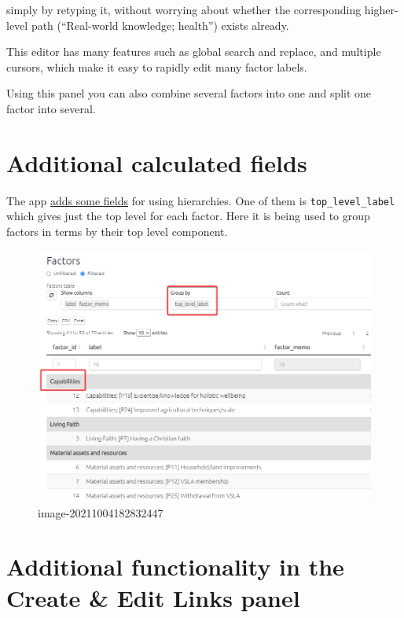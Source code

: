 \documentclass[
]{book}
\begin{document}
simply by retyping it, without worrying about whether the corresponding higher-level path (``Real-world knowledge; health'') exists already.

This editor has many features such as global search and replace, and multiple cursors, which make it easy to rapidly edit many factor labels.

Using this panel you can also combine several factors into one and split one factor into several.

\hypertarget{additional-calculated-fields}{%
\section{Additional calculated fields}\label{additional-calculated-fields}}

The app \protect\hyperlink{xcalculated-fields}{adds some fields} for using hierarchies. One of them is \texttt{top\_level\_label} which gives just the top level for each factor. Here it is being used to group factors in terms by their top level component.

\begin{figure}
\centering
\includegraphics[width=6.77083in,height=\textheight]{_assets/image-20211004182832447.png}
\caption{image-20211004182832447}
\end{figure}

\hypertarget{additional-functionality-in-the-create-edit-links-panel}{%
\section{Additional functionality in the Create \& Edit Links panel}\label{additional-functionality-in-the-create-edit-links-panel}}
\end{document}
